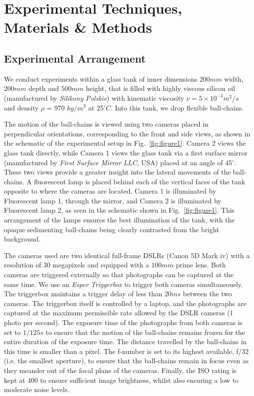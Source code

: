\documentclass{article}
\begin{document}
\section{Experimental Techniques, Materials \& Methods} \label{Exp_techniques_materials_methods}

\subsection{Experimental Arrangement} \label{Exp_setup}

We conduct experiments within a glass tank of inner dimensions $200 mm$ width, %
$200 mm$ depth and %
$500 mm$ height, that is filled with highly viscous silicon oil (manufactured by \textit{Silikony Polskie}) with kinematic viscosity $\nu = 5 \times 10^{-3} m^2/s$ and density $\rho$ = 970 $kg/m^3$ at 25$^{\circ}C$. Into this tank, we drop flexible ball-chains. 


The motion of the ball-chains is viewed using two cameras placed in perpendicular orientations, corresponding to the front and side views, as shown in the schematic of the experimental setup in Fig.~\ref{fig:figure1}. Camera 2 views the glass tank directly, while Camera 1 views the glass tank via a first surface mirror (manufactured by \textit{First Surface Mirror LLC}, USA) placed at an angle of 45$^{\circ}$. These two views provide a greater insight into the lateral movements of the ball-chains. A fluorescent lamp is placed behind each of the vertical faces of the tank opposite to where the cameras are located. Camera 1 is illuminated by Fluorescent lamp 1, through the mirror, and Camera 2 is illuminated by Fluorescent lamp 2, as seen in the schematic shown in Fig.~\ref{fig:figure1}. This arrangement of the lamps ensures the best illumination of the tank, with the opaque sedimenting ball-chains being clearly contrasted from the bright background.

The cameras used are two identical full-frame DSLRs (Canon 5D Mark iv) with a resolution of 30 megapixels and equipped with a $100 mm$ prime lens. Both cameras are triggered externally so that photographs can be captured at the same time. We use an \textit{Esper Triggerbox} to trigger both cameras simultaneously. The triggerbox maintains a trigger delay of less than $20 ms$ between the two cameras. The triggerbox itself is controlled by a laptop, and the photographs are captured at the maximum permissible rate allowed by the DSLR cameras (1 photo per second). The exposure time of the photographs from both cameras is set to $1/125 s$ to ensure that the motion of the ball-chains remains frozen for the entire duration of the exposure time. The distance travelled by the ball-chains in this time is smaller than a pixel. The f-number is set to its highest available, f/32 (i.e. the smallest aperture), to ensure that the ball-chains remain in focus even as they meander out of the focal plane of the cameras. Finally, the ISO rating is kept at 400 to ensure sufficient image brightness, whilst also ensuring a low to moderate noise levels. 
\end{document}
